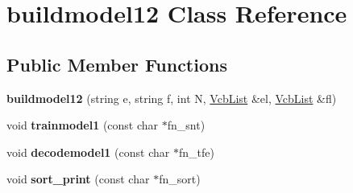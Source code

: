 \hypertarget{classbuildmodel12}{\section{buildmodel12 \-Class \-Reference}
\label{classbuildmodel12}
}
\subsection*{\-Public \-Member \-Functions}
\begin{DoxyCompactItemize}
\item 
\hypertarget{classbuildmodel12_a7f0cb53d7f57860cf4bdc4c9af56831a}{{\bfseries buildmodel12} (string e, string f, int \-N, \hyperlink{classVcbList}{\-Vcb\-List} \&el, \hyperlink{classVcbList}{\-Vcb\-List} \&fl)}\label{classbuildmodel12_a7f0cb53d7f57860cf4bdc4c9af56831a}

\item 
\hypertarget{classbuildmodel12_a2f76579944543cca5d4221c8126a007b}{void {\bfseries trainmodel1} (const char $\ast$fn\-\_\-snt)}\label{classbuildmodel12_a2f76579944543cca5d4221c8126a007b}

\item 
\hypertarget{classbuildmodel12_a9cea0199e42401504b9b5d5d6a974a99}{void {\bfseries decodemodel1} (const char $\ast$fn\-\_\-tfe)}\label{classbuildmodel12_a9cea0199e42401504b9b5d5d6a974a99}

\item 
\hypertarget{classbuildmodel12_a85d991c75d1cb0bba943c119c95db88b}{void {\bfseries sort\-\_\-print} (const char $\ast$fn\-\_\-sort)}\label{classbuildmodel12_a85d991c75d1cb0bba943c119c95db88b}

\end{DoxyCompactItemize}
